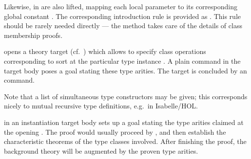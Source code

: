 \begin{isabellebody}
\begin{isamarkuptext}
\begin{descr}
  Likewise, \mbox{} in  are also lifted,
  mapping each local parameter  to its
  corresponding global constant .  The
  corresponding introduction rule is provided as .  This rule should be rarely needed directly
  --- the \mbox{} method takes care of the details of
  class membership proofs.

  \item [\mbox{\isa{\isacommand{instantiation}}}~\isa{{\isachardoublequote}t\ {\isacharcolon}{\isacharcolon}\ {\isacharparenleft}s\isactrlsub {\isadigit{1}}{\isacharcomma}\ {\isasymdots}{\isacharcomma}\ s\isactrlsub n{\isacharparenright}\ s\ {\isasymBEGIN}{\isachardoublequote}}] opens a theory target (cf.\
  ) which allows to specify class operations  corresponding to sort  at the
  particular type instance .  A plain \mbox{} command
  in the target body poses a goal stating these type arities.  The
  target is concluded by an \indexref{}{command}{end}\mbox{} command.

  Note that a list of simultaneous type constructors may be given;
  this corresponds nicely to mutual recursive type definitions, e.g.\
  in Isabelle/HOL.

  \item [\mbox{\isa{\isacommand{instance}}}] in an instantiation target body sets
  up a goal stating the type arities claimed at the opening \mbox{}.  The proof would usually proceed by \mbox{}, and then establish the characteristic theorems of
  the type classes involved.  After finishing the proof, the
  background theory will be augmented by the proven type arities.


\end{descr}
\end{isamarkuptext}
\end{isabellebody}
